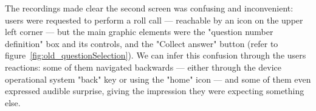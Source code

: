 



The recordings made clear the second screen was confusing and inconvenient: users were requested to perform a roll call --- reachable by an icon on the upper left corner --- but the main graphic elements were the "question number definition" box and its controls, and the "Collect answer" button (refer to figure~\ref{fig:old_questionSelection}). We can infer this confusion through the users reactions: some of them navigated backwards --- either through the device operational system "back" key or using the "home" icon --- and some of them even expressed audible surprise, giving the impression they were expecting something else.



